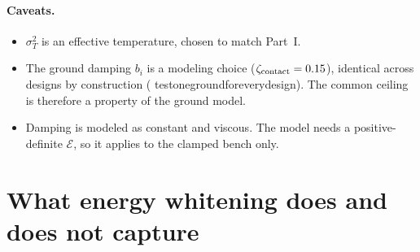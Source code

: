 \documentclass[11pt]{article}
\theoremstyle{definition}
\theoremstyle{remark}
\newcommand{\Em}{\mathcal{E}}         %
\newcommand{\codeus}{\textunderscore\allowbreak}
\newcommand{\code}[1]{{\ttfamily\let\_\codeus\hyphenchar\font=-1 #1}}
\begin{document}
\paragraph{Caveats.}
\begin{itemize}[nosep]
  \item $\sigma_T^2$ is an effective temperature, chosen to match Part~I.
  \item The ground damping $b_i$ is a modeling choice ($\zeta_{\rm contact}=0.15$),
        identical across designs by construction
        (\code{test\_one\_ground\_for\_every\_design}). The common ceiling is therefore a
        property of the ground model.
  \item Damping is modeled as constant and viscous. The model needs a positive-definite
        $\Em$, so it applies to the clamped bench only.
\end{itemize}

\section{What energy whitening does and does not capture}
\label{sec:capture}
\end{document}

